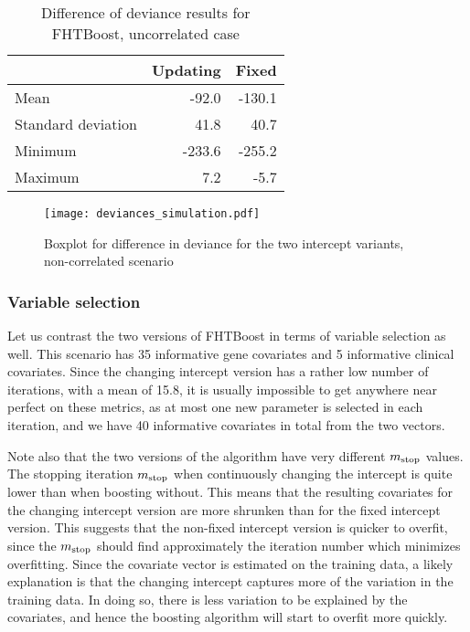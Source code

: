 \begin{table}
\caption{Difference of deviance results for FHTBoost, uncorrelated case}
\label{table:uncorrelated-deviance}
\centering
\begin{tabular}{l|rr}
\toprule
& Updating & Fixed \\
\hline
Mean               &  -92.0  & -130.1  \\
Standard deviation &   41.8  &   40.7  \\
Minimum            & -233.6  & -255.2  \\
Maximum            &    7.2  &   -5.7  \\
\bottomrule
\end{tabular}
\end{table}

\begin{figure}
\caption{Boxplot for difference in deviance for the two intercept variants, non-correlated scenario}
\label{fig:simulation-uncorrelated-deviances-boxplot}
\centering
\texttt{[image: deviances\_simulation.pdf]}
\end{figure}

\subsubsection{Variable selection}
Let us contrast the two versions of FHTBoost in terms of variable selection as well.
This scenario has 35 informative gene covariates and 5 informative clinical covariates.
Since the changing intercept version has a rather low number of iterations, with a mean of 15.8, it is usually impossible to get anywhere near perfect on these metrics, as at most one new parameter is selected in each iteration, and we have 40 informative covariates in total from the two vectors.

Note also that the two versions of the algorithm have very different $m_{\text{stop}}$ values.
The stopping iteration $m_{\text{stop}}$ when continuously changing the intercept is quite lower than when boosting without.
This means that the resulting covariates for the changing intercept version are more shrunken than for the fixed intercept version.
This suggests that the non-fixed intercept version is quicker to overfit, since the $m_{\text{stop}}$ should find approximately the iteration number which minimizes overfitting.
Since the covariate vector is estimated on the training data, a likely explanation is that the changing intercept captures more of the variation in the training data.
In doing so, there is less variation to be explained by the covariates, and hence the boosting algorithm will start to overfit more quickly.

